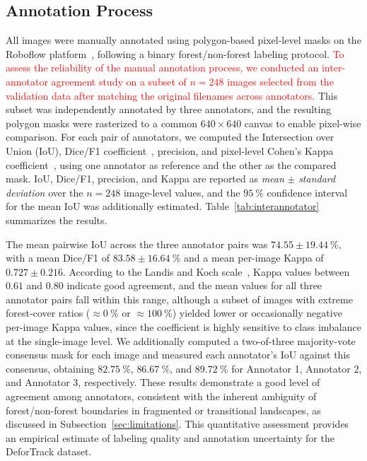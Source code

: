 \documentclass[journal,article,submit,pdftex,moreauthors]{Definitions/mdpi}
\begin{document}
\subsection{Annotation Process}

All images were manually annotated using polygon-based pixel-level masks on the Roboflow platform~\cite{roboflow2026defortrack}, following a binary forest/non-forest labeling protocol. \textcolor{red}{To assess the reliability of the manual annotation process, we conducted an inter-annotator agreement study on a subset of $n=248$ images selected from the validation data after matching the original filenames across annotators.} This subset was independently annotated by three annotators, and the resulting polygon masks were rasterized to a common $640 \times 640$ canvas to enable pixel-wise comparison. For each pair of annotators, we computed the Intersection over Union (IoU), Dice/F1 coefficient~\cite{dice1945measures}, precision, and pixel-level Cohen's Kappa coefficient~\cite{wan2015kappa}, using one annotator as reference and the other as the compared mask. IoU, Dice/F1, precision, and Kappa are reported as \textit{mean} $\pm$ \textit{standard deviation} over the $n=248$ image-level values, and the $95~\%$ confidence interval for the mean IoU was additionally estimated. Table~\ref{tab:interannotator} summarizes the results.
 
The mean pairwise IoU across the three annotator pairs was $74.55 \pm 19.44~\%$, with a mean Dice/F1 of $83.58 \pm 16.64~\%$ and a mean per-image Kappa of $0.727 \pm 0.216$. According to the Landis and Koch scale~\cite{landis1977}, Kappa values between $0.61$ and $0.80$ indicate good agreement, and the mean values for all three annotator pairs fall within this range, although a subset of images with extreme forest-cover ratios ($\approx 0~\%$ or $\approx 100~\%$) yielded lower or occasionally negative per-image Kappa values, since the coefficient is highly sensitive to class imbalance at the single-image level. We additionally computed a two-of-three majority-vote consensus mask for each image and measured each annotator's IoU against this consensus, obtaining $82.75~\%$, $86.67~\%$, and $89.72~\%$ for Annotator 1, Annotator 2, and Annotator 3, respectively. These results demonstrate a good level of agreement among annotators, consistent with the inherent ambiguity of forest/non-forest boundaries in fragmented or transitional landscapes, as discussed in Subsection~\ref{sec:limitations}. This quantitative assessment provides an empirical estimate of labeling quality and annotation uncertainty for the DeforTrack dataset.
 
\end{document}
